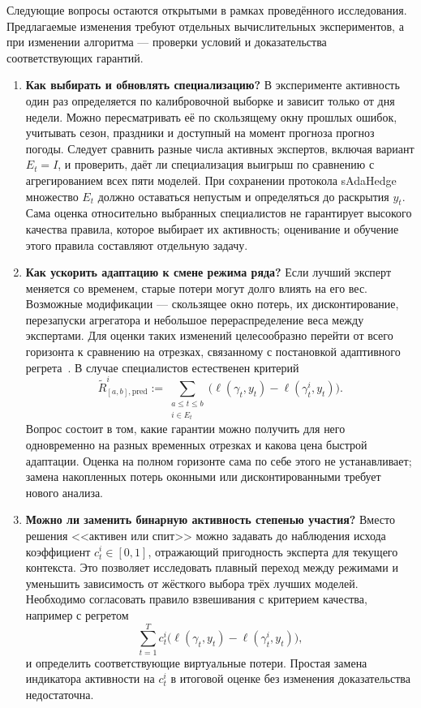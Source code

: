 \documentclass[a4paper,12pt]{article}
\theoremstyle{plain}
\theoremstyle{definition}
\theoremstyle{remark}
\numberwithin{equation}{section}
\begin{document}
Следующие вопросы остаются открытыми в рамках проведённого исследования. Предлагаемые изменения требуют отдельных вычислительных экспериментов, а при изменении алгоритма --- проверки условий и доказательства соответствующих гарантий.

\begin{enumerate}
 \item \textbf{Как выбирать и обновлять специализацию?}
 В эксперименте активность один раз определяется по калибровочной выборке и зависит только от дня недели. Можно пересматривать её по скользящему окну прошлых ошибок, учитывать сезон, праздники и доступный на момент прогноза прогноз погоды. Следует сравнить разные числа активных экспертов, включая вариант $E_t=I$, и проверить, даёт ли специализация выигрыш по сравнению с агрегированием всех пяти моделей. При сохранении протокола sAdaHedge множество $E_t$ должно оставаться непустым и определяться до раскрытия $y_t$. Сама оценка относительно выбранных специалистов не гарантирует высокого качества правила, которое выбирает их активность; оценивание и обучение этого правила составляют отдельную задачу.

 \item \textbf{Как ускорить адаптацию к смене режима ряда?}
 Если лучший эксперт меняется со временем, старые потери могут долго влиять на его вес. Возможные модификации --- скользящее окно потерь, их дисконтирование, перезапуски агрегатора и небольшое перераспределение веса между экспертами. Для оценки таких изменений целесообразно перейти от всего горизонта к сравнению на отрезках, связанному с постановкой адаптивного регрета~\cite{Adaptive}. В случае специалистов естественен критерий
 \[
  \widetilde R_{[a,b],\mathrm{pred}}^i
  :=\sum_{\substack{a\leqslant t\leqslant b\\i\in E_t}}
  \bigl(\ell(\gamma_t,y_t)-\ell(\gamma_t^i,y_t)\bigr).
 \]
 Вопрос состоит в том, какие гарантии можно получить для него одновременно на разных временных отрезках и какова цена быстрой адаптации. Оценка на полном горизонте сама по себе этого не устанавливает; замена накопленных потерь оконными или дисконтированными требует нового анализа.

 \item \textbf{Можно ли заменить бинарную активность степенью участия?}
 Вместо решения <<активен или спит>> можно задавать до наблюдения исхода коэффициент $c_t^i\in[0,1]$, отражающий пригодность эксперта для текущего контекста. Это позволяет исследовать плавный переход между режимами и уменьшить зависимость от жёсткого выбора трёх лучших моделей. Необходимо согласовать правило взвешивания с критерием качества, например с регретом
 \[
  \sum_{t=1}^{T}c_t^i
  \bigl(\ell(\gamma_t,y_t)-\ell(\gamma_t^i,y_t)\bigr),
 \]
 и определить соответствующие виртуальные потери. Простая замена индикатора активности на $c_t^i$ в итоговой оценке без изменения доказательства недостаточна.


\end{enumerate}
\end{document}
